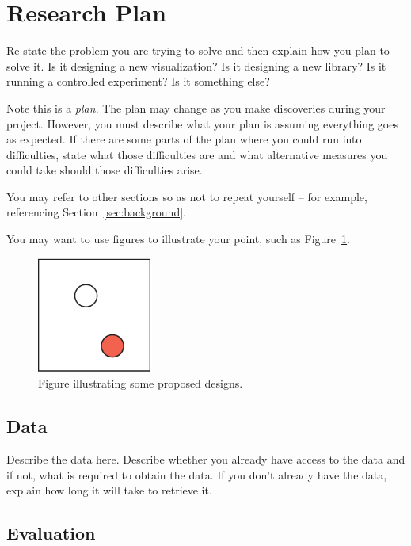 \section{Research Plan} 
\label{sec:research}

Re-state the problem you are trying to solve and then explain how you plan to solve it. Is it designing a new visualization? Is it designing a new library?  Is it running a controlled experiment? Is it something else?

Note this is a {\em plan}. The plan may change as you make discoveries during your project. However, you must describe what your plan is assuming everything goes as expected. If there are some parts of the plan where you could run into difficulties, state what those difficulties are and what alternative measures you could take should those difficulties arise.

You may refer to other sections so as not to repeat yourself -- for example, referencing Section~\ref{sec:background}.

You may want to use figures to illustrate your point, such as Figure~\ref{fig:sample}.

\begin{figure}[h]
 \centering %
 \includegraphics[width=1.5in]{figs/sample}
 \caption{Figure illustrating some proposed designs.}
 \label{fig:sample}
\end{figure}

\subsection{Data}
\label{sec:data}

Describe the data here. Describe whether you already have access to the data and if not, what is required to obtain the data. If you don't already have the data, explain how long it will take to retrieve it. 

\subsection{Evaluation}
\label{sec:eval}

